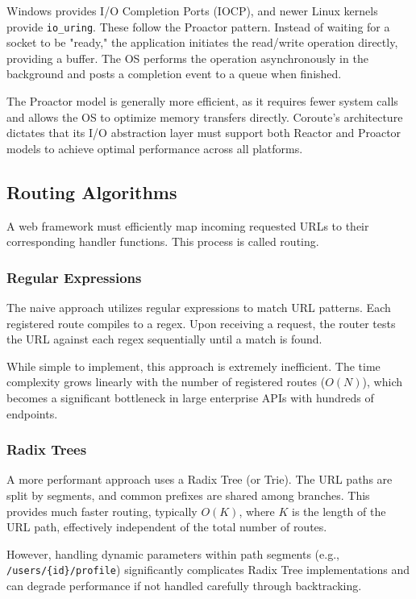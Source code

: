 Windows provides I/O Completion Ports (IOCP), and newer Linux kernels provide \texttt{io\_uring}. These follow the Proactor pattern. Instead of waiting for a socket to be "ready," the application initiates the read/write operation directly, providing a buffer. The OS performs the operation asynchronously in the background and posts a completion event to a queue when finished.

The Proactor model is generally more efficient, as it requires fewer system calls and allows the OS to optimize memory transfers directly. Coroute's architecture dictates that its I/O abstraction layer must support both Reactor and Proactor models to achieve optimal performance across all platforms.

\subsection{Routing Algorithms}

A web framework must efficiently map incoming requested URLs to their corresponding handler functions. This process is called routing.

\subsubsection{Regular Expressions}

The naive approach utilizes regular expressions to match URL patterns. Each registered route compiles to a regex. Upon receiving a request, the router tests the URL against each regex sequentially until a match is found.

While simple to implement, this approach is extremely inefficient. The time complexity grows linearly with the number of registered routes ($O(N)$), which becomes a significant bottleneck in large enterprise APIs with hundreds of endpoints.

\subsubsection{Radix Trees}

A more performant approach uses a Radix Tree (or Trie). The URL paths are split by segments, and common prefixes are shared among branches. This provides much faster routing, typically $O(K)$, where $K$ is the length of the URL path, effectively independent of the total number of routes.

However, handling dynamic parameters within path segments (e.g., \texttt{/users/\{id\}/profile}) significantly complicates Radix Tree implementations and can degrade performance if not handled carefully through backtracking.

